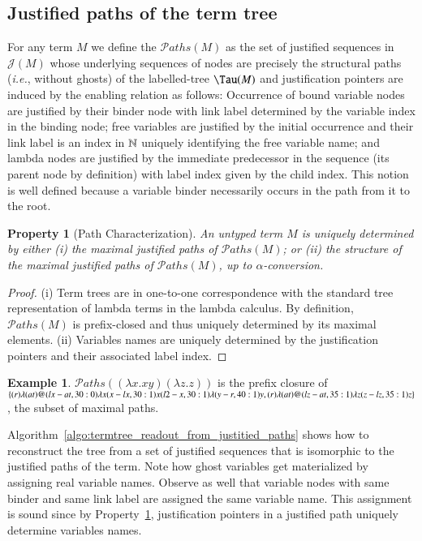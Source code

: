 \documentclass{elsarticle}
\makeatletter
\theoremstyle{plain}
\newtheorem{property}[theorem]{Property}
\theoremstyle{definition}
\newtheorem{example}{Example}[section]
\newcommand{\ctree}{\Tau} %
\newcommand\pathset{{\mathcal{P}aths}} %
\renewcommand\ie{{\it i.e.\@\xspace}}
\def\justseqset{\mathcal{J}}
\makeatother
\begin{document}

\subsection{Justified paths of the term tree}

For any term $M$ we define the  $\pathset(M)$ as the set of justified sequences in $\justseqset(M)$ whose underlying sequences of nodes are precisely the structural paths (\ie, without ghosts) of the labelled-tree $\ctree(M)$ and justification pointers are induced by the enabling relation as follows: Occurrence of bound variable nodes are justified by their binder node with link label determined by the variable index in the binding node; free variables are justified by the initial occurrence and their link label is an index in $\mathbb{N}$ uniquely identifying the free variable name; and lambda nodes are justified by the immediate predecessor in the sequence (its parent node by definition) with label index given by the child index. This notion is well defined because a variable binder necessarily occurs in the path from it to the root.
\begin{property}[Path Characterization]
\label{prop:tree_path_charact}
 An untyped term $M$ is uniquely determined by either
(i) the maximal justified paths of $\pathset(M)$;
or (ii) the \emph{structure} of the maximal justified paths of $\pathset(M)$, up to $\alpha$-conversion.
\end{property}
\begin{proof}
(i) Term trees are in one-to-one correspondence with the standard tree representation of lambda terms in the lambda calculus. By definition, $\pathset(M)$ is prefix-closed and thus uniquely determined by its maximal elements. (ii) Variables names are uniquely determined by the justification pointers and their associated label index.
\end{proof}

\begin{example}
  $\pathset((\lambda x.x y) (\lambda z.z))$ is the prefix closure of
  $\{
  \Pstr{ (r){\lambda} (at){@} (lx-at,30:0){\lambda x} (x-lx,30:1){x} (l2-x,30:1){\lambda} (y-r,40:1){y} },
  \Pstr{ (r){\lambda} (at){@} (lz-at,35:1){\lambda z} (z-lz,35:1){z}}
  \}$, the subset of maximal paths.
\end{example}

Algorithm~\ref{algo:termtree_readout_from_justitied_paths} shows how to reconstruct the tree from a set of justified sequences that is isomorphic to the justified paths of the term. Note how ghost variables get materialized by  assigning real variable names. Observe as well that variable nodes with same binder and same link label are assigned the same variable name. This assignment is sound since by Property~\ref{prop:tree_path_charact}, justification pointers in a justified path uniquely determine variables names.
\end{document}
